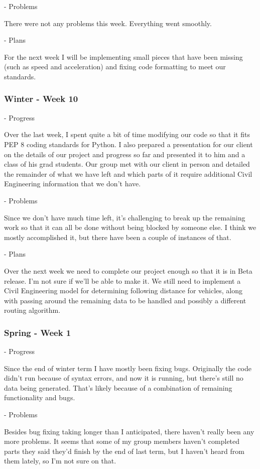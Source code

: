 \documentclass[onecolumn, draftclsnofoot,10pt, compsoc]{IEEEtran}
\begin{document}
- Problems

There were not any problems this week.
Everything went smoothly.

- Plans

For the next week I will be implementing small pieces that have been missing (such as speed and acceleration) and fixing code formatting to meet our standards.
\subsubsection{Winter - Week 10}
- Progress

Over the last week, I spent quite a bit of time modifying our code so that it fits PEP 8 coding standards for Python.
I also prepared a presentation for our client on the details of our project and progress so far and presented it to him and a class of his grad students.
Our group met with our client in person and detailed the remainder of what we have left and which parts of it require additional Civil Engineering information that we don't have.

- Problems

Since we don't have much time left, it's challenging to break up the remaining work so that it can all be done without being blocked by someone else.
I think we mostly accomplished it, but there have been a couple of instances of that.

- Plans

Over the next week we need to complete our project enough so that it is in Beta release.
I'm not sure if we'll be able to make it.
We still need to implement a Civil Engineering model for determining following distance for vehicles, along with passing around the remaining data to be handled and possibly a different routing algorithm.
\subsubsection{Spring - Week 1}
- Progress

Since the end of winter term I have mostly been fixing bugs.
Originally the code didn't run because of syntax errors, and now it is running, but there's still no data being generated.
That's likely because of a combination of remaining functionality and bugs.

- Problems

Besides bug fixing taking longer than I anticipated, there haven't really been any more problems.
It seems that some of my group members haven't completed parts they said they'd finish by the end of last term, but I haven't heard from them lately, so I'm not sure on that.
\end{document}
